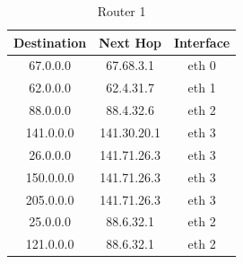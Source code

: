 \documentclass{WeSTassignment}
\begin{document}
\begin{table}[h]
\centering
\caption{Router 1}
\label{Router 1}
\begin{tabular}{ccc}
\hline
\multicolumn{1}{|c|}{\textbf{Destination}} & \multicolumn{1}{c|}{\textbf{Next Hop}} & \multicolumn{1}{c|}{\textbf{Interface}} \\ \hline
67.0.0.0                                   & 67.68.3.1                              & eth 0                                   \\
62.0.0.0                                   & 62.4.31.7                              & eth 1                                   \\
88.0.0.0                                   & 88.4.32.6                              & eth 2                                    \\
141.0.0.0                                  & 141.30.20.1                            & eth 3                                    \\
26.0.0.0                                   & 141.71.26.3                            & eth 3                                   \\
150.0.0.0                                  & 141.71.26.3                            & eth 3                                   \\
205.0.0.0                                  & 141.71.26.3                            & eth 3                                    \\
25.0.0.0                                   & 88.6.32.1                              & eth 2                                    \\
121.0.0.0                                  & 88.6.32.1                              & eth 2                                   
\end{tabular}
\end{table}
\end{document}

